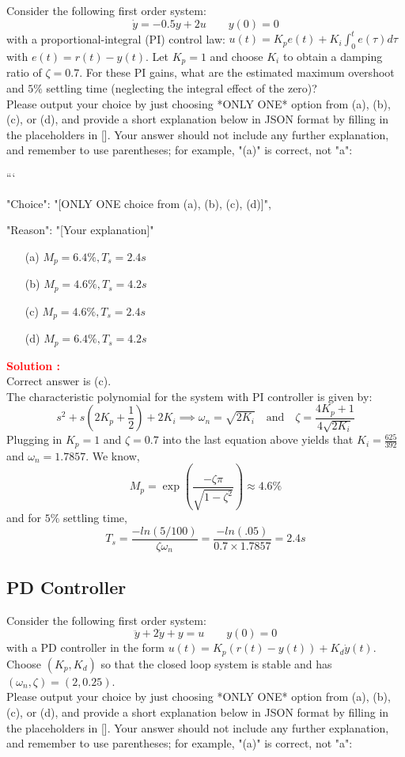 \documentclass[12pt]{article}
\begin{document}
Consider the following first order system:
\[
\dot{y} = -0.5y + 2u \qquad  y(0) = 0
\]
with a proportional-integral (PI) control law:  $u(t)=K_p e(t)+K_i \int_0^t e(\tau) d \tau$ with $e(t)=r(t)-y(t)$. Let $K_p=1$ and choose $K_i$ to obtain a damping ratio of $\zeta = 0.7$.  For these PI gains, what are the estimated maximum overshoot and $5\%$ settling time (neglecting the integral effect of the zero)? \\
Please output your choice by just choosing *ONLY ONE* option from (a), (b), (c), or (d), and provide a short explanation below in JSON format by filling in the placeholders in []. Your answer should not include any further explanation, and remember to use parentheses; for example, "(a)" is correct, not "a":

```
{

"Choice": "[ONLY ONE choice from (a), (b), (c), (d)]",

"Reason": "[Your explanation]"

}

\begin{itemize}
    \item[(a)] \(M_p = 6.4 \% , T_s = 2.4 s \)
    \item[(b)] \(M_p = 4.6 \% , T_s = 4.2 s \)
    \item[(c)] \(M_p = 4.6 \% , T_s = 2.4 s \)
    \item[(d)] \(M_p = 6.4 \% , T_s = 4.2 s \)
\end{itemize}
\textbf{\textcolor{red}{Solution :}} \\
Correct answer is (c).\\
The characteristic polynomial for the system with PI controller is given by:
\[
s^2 + s (2K_p + \frac{1}{2}) + 2K_i \implies \omega_n = \sqrt{2K_i} \quad \text{and} \quad \zeta = \frac{4K_p + 1}{4\sqrt{2K_i}}
\]
Plugging in $K_p = 1$ and $\zeta=0.7$ into the last equation above yields that $K_i =\frac{625}{392}$ and $\omega_n=1.7857$. We know,
\[
M_p=\exp{\left(\frac{-\zeta \pi }{\sqrt{1-\zeta^2}}\right)} \approx 4.6\%
\]
and for $5\%$ settling time,
\[
T_s =\frac{-ln (5/100)}{\zeta \omega_n}=\frac{-ln (.05)}{0.7 \times 1.7857} =2.4s
\]
\clearpage

\subsection{PD Controller}

Consider the following first order system:
\[
\ddot{y} +2\dot{y} +y = u \qquad  y(0) = 0
\]
with a PD controller in the form $u(t) = K_p(r(t) - y(t)) + K_d \dot{y}(t)$.
Choose $(K_p, K_d)$ so that the closed loop system is stable and has $(\omega_n, \zeta) = (2, 0.25)$. \\
Please output your choice by just choosing *ONLY ONE* option from (a), (b), (c), or (d), and provide a short explanation below in JSON format by filling in the placeholders in []. Your answer should not include any further explanation, and remember to use parentheses; for example, "(a)" is correct, not "a":
\end{document}
